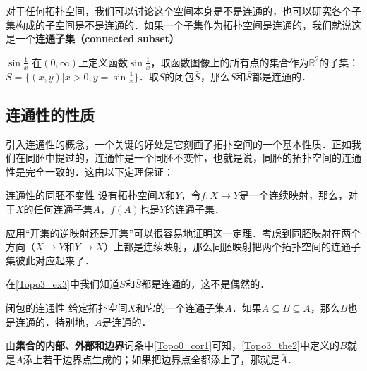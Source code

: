 对于任何拓扑空间，我们可以讨论这个空间本身是不是连通的，也可以研究各个子集构成的子空间是不是连通的．如果一个子集作为拓扑空间是连通的，我们就说这是一个\textbf{连通子集（connected subset）}

\begin{example}{$\sin{\frac{1}{x}}$}\label{Topo3_ex3}
在$(0,\infty)$上定义函数$\sin{\frac{1}{x}}$，取函数图像上的所有点的集合作为$\mathbb{R}^2$的子集：$S=\{(x, y)|x>0, y=\sin{\frac{1}{x}}\}$．取$S$的闭包$\bar{S}$，那么$S$和$\bar{S}$都是连通的．
\end{example}

\subsection{连通性的性质}

引入连通性的概念，一个关键的好处是它刻画了拓扑空间的一个基本性质．正如我们在同胚中提过的，连通性是一个同胚不变性，也就是说，同胚的拓扑空间的连通性是完全一致的．这由以下定理保证：

\begin{theorem}{连通性的同胚不变性}\label{Topo3_the1}
设有拓扑空间$X$和$Y$，令$f:X\rightarrow Y$是一个连续映射，那么，对于$X$的任何连通子集$A$，$f(A)$也是$Y$的连通子集．
\end{theorem}

应用“开集的逆映射还是开集”可以很容易地证明这一定理．考虑到同胚映射在两个方向（$X\rightarrow Y$和$Y\rightarrow X$）上都是连续映射，那么同胚映射把两个拓扑空间的连通子集彼此对应起来了．

在\autoref{Topo3_ex3}中我们知道$S$和$\bar{S}$都是连通的，这不是偶然的．

\begin{theorem}{闭包的连通性}\label{Topo3_the2}
给定拓扑空间$X$和它的一个连通子集$A$．如果$A\subseteq B\subseteq\bar{A}$，那么$B$也是连通的．特别地，$\bar{A}$是连通的．
\end{theorem}

由\textbf{集合的内部、外部和边界}词条中\autoref{Topo0_cor1}可知，\autoref{Topo3_the2}中定义的$B$就是$A$添上若干边界点生成的；如果把边界点全都添上了，那就是$\bar{A}$．
